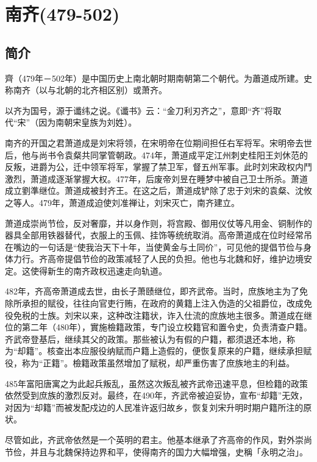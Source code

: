 

\section{南齐\tiny(479-502)}

\subsection{简介}

齊（479年－502年）是中国历史上南北朝时期南朝第二个朝代。为蕭道成所建。史称南齐（以与北朝的北齐相区别）或萧齐。

以齐为国号，源于谶纬之说。《谶书》云：“金刀利刃齐之”，意即“齐”将取代“宋”（因为南朝宋皇族为刘姓）。

南齐的开国之君萧道成是刘宋将领，在宋明帝在位期间担任右军将军。宋明帝去世后，他与尚书令袁粲共同掌管朝政。474年，萧道成平定江州刺史桂阳王刘休范的反叛，进爵为公，迁中领军将军，掌握了禁卫军，督五州军事。此时刘宋政权内鬥激烈，萧道成逐渐掌握大权。477年，后废帝刘昱在睡梦中被自己卫士所杀。萧道成立劉準继位。萧道成被封齐王。在这之后，萧道成铲除了忠于刘宋的袁粲、沈攸之等人。479年，萧道成迫使刘准禅让，刘宋灭亡，南齐建立。

萧道成崇尚节俭，反对奢靡，并以身作则，将宫殿、御用仪仗等凡用金、铜制作的器具全部用铁器替代，衣服上的玉佩、挂饰等统统取消。高帝萧道成在位时经常吊在嘴边的一句话是“使我治天下十年，当使黄金与土同价”，可见他的提倡节俭与身体力行。齐高帝提倡节俭的政策减轻了人民的负担。他也与北魏和好，维护边境安定。这使得新生的南齐政权迅速走向轨道。

482年，齐高帝萧道成去世，由长子萧赜继位，即齐武帝。当时，庶族地主为了免除所承担的赋役，往往向官吏行贿，在政府的黄籍上注入伪造的父祖爵位，改成免役免税的士族。刘宋以来，这种改注籍状，诈入仕流的庶族地主很多。萧道成在继位的第二年（480年），實施檢籍政策，专门设立校籍官和置令史，负责清查户籍。齐武帝登基后，继续其父的政策。那些被认为有假的户籍，都须退还本地，称为“却籍”。核查出本应服役纳赋而户籍上造假的，便恢复原来的户籍，继续承担赋役，称为“正籍”。檢籍政策虽然增加了赋税，却严重伤害了庶族地主的利益。

485年富阳唐寓之为此起兵叛乱，虽然这次叛乱被齐武帝迅速平息，但检籍的政策依然受到庶族的激烈反对。最终，在490年，齐武帝被迫妥协，宣布“却籍”无效，对因为“却籍”而被发配戍边的人民准许返归故乡，恢复刘宋升明时期户籍所注的原状。

尽管如此，齐武帝依然是一个英明的君主。他基本继承了齐高帝的作风，對外崇尚节俭，并且与北魏保持边界和平，使得南齐的国力大幅增强，史稱「永明之治」。

